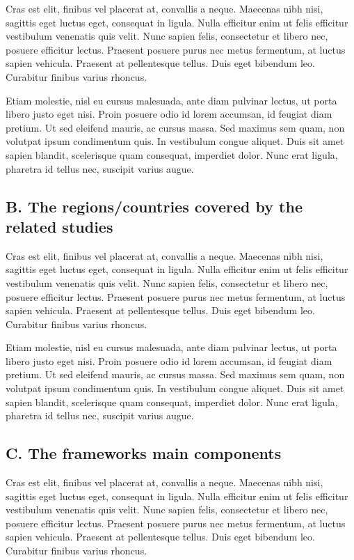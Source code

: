 \documentclass[a4paper,fleqn,spanish]{cas-dc}
\begin{document}
Cras est elit, finibus vel placerat at, convallis a neque. Maecenas nibh nisi,
sagittis eget luctus eget, consequat in ligula. Nulla efficitur enim ut felis
efficitur vestibulum venenatis quis velit. Nunc sapien felis, consectetur et
libero nec, posuere efficitur lectus. Praesent posuere purus nec metus
fermentum, at luctus sapien vehicula. Praesent at pellentesque tellus. Duis eget
bibendum leo. Curabitur finibus varius rhoncus.

Etiam molestie, nisl eu cursus malesuada, ante diam pulvinar lectus, ut porta
libero justo eget nisi. Proin posuere odio id lorem accumsan, id feugiat diam
pretium. Ut sed eleifend mauris, ac cursus massa. Sed maximus sem quam, non
volutpat ipsum condimentum quis. In vestibulum congue aliquet. Duis sit amet
sapien blandit, scelerisque quam consequat, imperdiet dolor. Nunc erat ligula,
pharetra id tellus nec, suscipit varius augue.


\subsection{B. The regions/countries covered by the related studies}\label{regiones}

Cras est elit, finibus vel placerat at, convallis a neque. Maecenas nibh nisi,
sagittis eget luctus eget, consequat in ligula. Nulla efficitur enim ut felis
efficitur vestibulum venenatis quis velit. Nunc sapien felis, consectetur et
libero nec, posuere efficitur lectus. Praesent posuere purus nec metus
fermentum, at luctus sapien vehicula. Praesent at pellentesque tellus. Duis eget
bibendum leo. Curabitur finibus varius rhoncus.

Etiam molestie, nisl eu cursus malesuada, ante diam pulvinar lectus, ut porta
libero justo eget nisi. Proin posuere odio id lorem accumsan, id feugiat diam
pretium. Ut sed eleifend mauris, ac cursus massa. Sed maximus sem quam, non
volutpat ipsum condimentum quis. In vestibulum congue aliquet. Duis sit amet
sapien blandit, scelerisque quam consequat, imperdiet dolor. Nunc erat ligula,
pharetra id tellus nec, suscipit varius augue.


\subsection{C. The frameworks main components}\label{componentes}

Cras est elit, finibus vel placerat at, convallis a neque. Maecenas nibh nisi,
sagittis eget luctus eget, consequat in ligula. Nulla efficitur enim ut felis
efficitur vestibulum venenatis quis velit. Nunc sapien felis, consectetur et
libero nec, posuere efficitur lectus. Praesent posuere purus nec metus
fermentum, at luctus sapien vehicula. Praesent at pellentesque tellus. Duis eget
bibendum leo. Curabitur finibus varius rhoncus.
\end{document}
